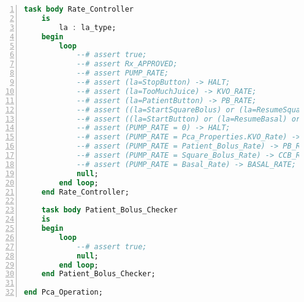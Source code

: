 \begin{lstlisting}[language=ada, gobble=0, numbers=left, caption={\lstinline{Pca_Operation} package}]
    task body Rate_Controller
    is
        la : la_type;
    begin
        loop
            --# assert true;
            --# assert Rx_APPROVED;
            --# assert PUMP_RATE;
            --# assert (la=StopButton) -> HALT;
            --# assert (la=TooMuchJuice) -> KVO_RATE;
            --# assert (la=PatientButton) -> PB_RATE;
            --# assert ((la=StartSquareBolus) or (la=ResumeSquareBolus)) -> CCB_RATE;
            --# assert ((la=StartButton) or (la=ResumeBasal) or (la=SquareBolusDone)) -> BASAL_RATE;
            --# assert (PUMP_RATE = 0) -> HALT;
            --# assert (PUMP_RATE = Pca_Properties.KVO_Rate) -> KVO_RATE;
            --# assert (PUMP_RATE = Patient_Bolus_Rate) -> PB_RATE;
            --# assert (PUMP_RATE = Square_Bolus_Rate) -> CCB_RRATE;
            --# assert (PUMP_RATE = Basal_Rate) -> BASAL_RATE;
            null;
        end loop;
    end Rate_Controller;

    task body Patient_Bolus_Checker
    is
    begin
        loop
            --# assert true;
            null;
        end loop;
    end Patient_Bolus_Checker;

end Pca_Operation;
\end{lstlisting} 
\label{listing:pca_generated:pca_operation}
\doublespacing

